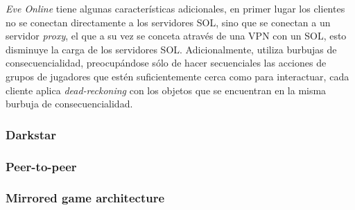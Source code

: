 \emph{Eve Online} tiene algunas características adicionales, en primer lugar los clientes no se conectan directamente a los servidores SOL, sino que se conectan a un servidor \emph{proxy}, el que a su vez se conceta através de una VPN con un SOL, esto disminuye la carga de los servidores SOL. Adicionalmente, utiliza burbujas de consecuencialidad, preocupándose sólo de hacer secuenciales las acciones de grupos de jugadores que estén suficientemente cerca como para interactuar, cada cliente aplica \emph{dead-reckoning} con los objetos que se encuentran en la misma burbuja de consecuencialidad.

\subsubsection{Darkstar}


\subsubsection{Peer-to-peer}


\subsubsection{Mirrored game architecture}


